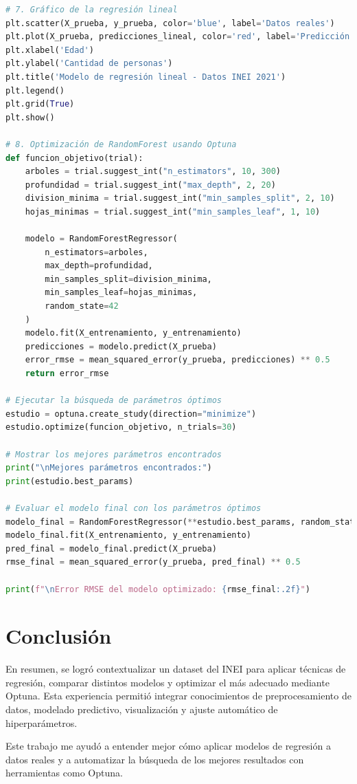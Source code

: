 \documentclass[a4paper,10pt]{article}
\begin{document}
\begin{lstlisting}[language=Python]
# 7. Gráfico de la regresión lineal
plt.scatter(X_prueba, y_prueba, color='blue', label='Datos reales')
plt.plot(X_prueba, predicciones_lineal, color='red', label='Predicción lineal')
plt.xlabel('Edad')
plt.ylabel('Cantidad de personas')
plt.title('Modelo de regresión lineal - Datos INEI 2021')
plt.legend()
plt.grid(True)
plt.show()

# 8. Optimización de RandomForest usando Optuna
def funcion_objetivo(trial):
    arboles = trial.suggest_int("n_estimators", 10, 300)
    profundidad = trial.suggest_int("max_depth", 2, 20)
    division_minima = trial.suggest_int("min_samples_split", 2, 10)
    hojas_minimas = trial.suggest_int("min_samples_leaf", 1, 10)

    modelo = RandomForestRegressor(
        n_estimators=arboles,
        max_depth=profundidad,
        min_samples_split=division_minima,
        min_samples_leaf=hojas_minimas,
        random_state=42
    )
    modelo.fit(X_entrenamiento, y_entrenamiento)
    predicciones = modelo.predict(X_prueba)
    error_rmse = mean_squared_error(y_prueba, predicciones) ** 0.5
    return error_rmse

# Ejecutar la búsqueda de parámetros óptimos
estudio = optuna.create_study(direction="minimize")
estudio.optimize(funcion_objetivo, n_trials=30)

# Mostrar los mejores parámetros encontrados
print("\nMejores parámetros encontrados:")
print(estudio.best_params)

# Evaluar el modelo final con los parámetros óptimos
modelo_final = RandomForestRegressor(**estudio.best_params, random_state=42)
modelo_final.fit(X_entrenamiento, y_entrenamiento)
pred_final = modelo_final.predict(X_prueba)
rmse_final = mean_squared_error(y_prueba, pred_final) ** 0.5

print(f"\nError RMSE del modelo optimizado: {rmse_final:.2f}")
\end{lstlisting}

\section*{Conclusión}

En resumen, se logró contextualizar un dataset del INEI para aplicar técnicas de regresión, comparar distintos modelos y optimizar el más adecuado mediante Optuna. Esta experiencia permitió integrar conocimientos de preprocesamiento de datos, modelado predictivo, visualización y ajuste automático de hiperparámetros. 

Este trabajo me ayudó a entender mejor cómo aplicar modelos de regresión a datos reales y a automatizar la búsqueda de los mejores resultados con herramientas como Optuna.
\end{document}
